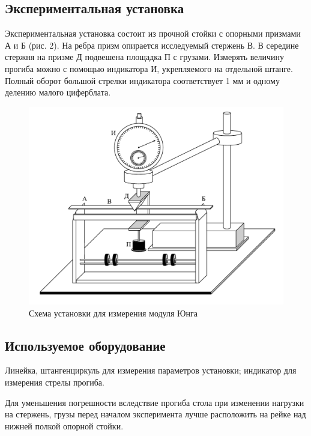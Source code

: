\documentclass[12pt]{article}
\begin{document}
    \subsection{Экспериментальная установка}
    \par Экспериментальная установка состоит из прочной стойки с
    опорными призмами А и Б (рис. 2). На ребра призм опирается исследуемый
    стержень В. В середине стержня на призме Д подвешена площадка
    П с грузами. Измерять величину
    прогиба можно с помощью индикатора И, укрепляемого
    на отдельной штанге. Полный оборот большой
    стрелки индикатора соответствует 1 мм и одному делению малого циферблата.
    \begin{figure}[H]
        \centering
        \includegraphics[scale = 0.25]{pictures/balka.png}
        \caption{Схема установки для измерения модуля Юнга}
    \end{figure}

    \subsection{Используемое оборудование}
    Линейка, штангенциркуль для измерения параметров установки;
    индикатор для измерения стрелы прогиба.
    \par Для уменьшения погрешности вследствие прогиба стола
    при изменении нагрузки на стержень, грузы перед началом эксперимента
    лучше расположить на рейке над нижней полкой опорной стойки.
\end{document}
